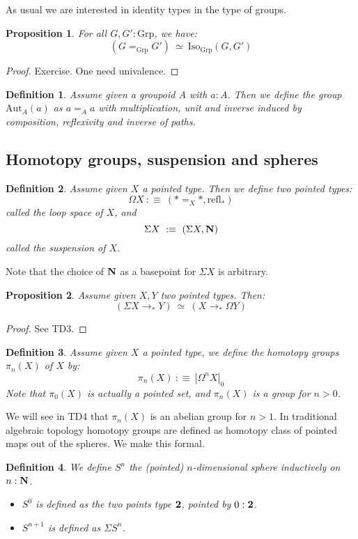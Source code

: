 \documentclass{article}
\newcommand{\sse}[1]{\medbreak \subsection{#1}}
\renewcommand{\r}{\rightarrow}
\newcommand{\refl}{\mathrm{refl}}
\newcommand{\N}{\mathrm{\bf N}}
\newcommand{\Grp}{\mathrm{Grp}}
\newcommand{\Iso}{\mathrm{Iso}}
\newcommand{\Aut}{\mathrm{Aut}}
\newcommand{\two}{{\bf 2}}
\newtheorem{definition}{Definition}
\newtheorem{proposition}{Proposition}
\begin{document}
As usual we are interested in identity types in the type of groups.

\begin{proposition}
For all $G,G':\Grp$, we have:
\[(G=_{\Grp} G') \ \simeq \ \Iso_{\Grp}(G,G')\]
\end{proposition}
\begin{proof}
Exercise. One need univalence.
\end{proof}


\begin{definition}
Assume given a groupoid $A$ with $a:A$. Then we define the group $\Aut_A(a)$ as $a=_Aa$ with multiplication, unit and inverse induced by composition, reflexivity and inverse of paths.
\end{definition}



\sse{Homotopy groups, suspension and spheres}

\begin{definition}
Assume given $X$ a pointed type. Then we define two pointed types:
\[\Omega X \ :\equiv\ (*=_X* , \refl_*)\]
called the loop space of $X$, and
\[\Sigma X \ :\equiv\ (\Sigma X , \N)\]
called the suspension of $X$.
\end{definition}

Note that the choice of $\N$ as a basepoint for $\Sigma X$ is arbitrary.

\begin{proposition}
Assume given $X,Y$ two pointed types. Then:
\[(\Sigma X \r_* Y)\ \simeq\ (X\r_*\Omega Y)\]
\end{proposition}
\begin{proof}
See TD3.
\end{proof}

\begin{definition}
Assume given $X$ a pointed type, we define the \emph{homotopy groups} $\pi_n(X)$ of $X$ by:
\[\pi_n(X) \ :\equiv\ |\Omega^n X|_0\]
Note that $\pi_0(X)$ is actually a pointed set, and $\pi_n(X)$ is a group for $n>0$.
\end{definition}

We will see in TD4 that $\pi_n(X)$ is an abelian group for $n>1$. In traditional algebraic topology homotopy groups are defined as homotopy class of pointed maps out of the spheres. We make this formal.

\begin{definition}
We define $S^n$ the (pointed) $n$-dimensional sphere inductively on $n:\N$. 
\begin{itemize}
\item $S^0$ is defined as the two points type $\two$, pointed by $0:\two$.
\item $S^{n+1}$ is defined as $\Sigma S^n$.
\end{itemize}
\end{definition}
\end{document}
